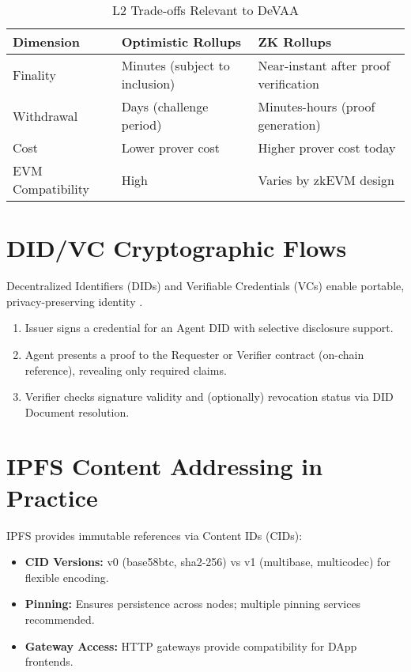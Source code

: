 \begin{table}[h]
\centering
\caption{L2 Trade-offs Relevant to DeVAA}
\label{tab:l2-tradeoffs}
\begin{tabular}{p{3.5cm}p{5.5cm}p{5.5cm}}
\toprule
\textbf{Dimension} & \textbf{Optimistic Rollups} & \textbf{ZK Rollups} \\
\midrule
Finality & Minutes (subject to inclusion) & Near-instant after proof verification \\
Withdrawal & Days (challenge period) & Minutes-hours (proof generation) \\
Cost & Lower prover cost & Higher prover cost today \\
EVM Compatibility & High & Varies by zkEVM design \\
\bottomrule
\end{tabular}
\end{table}

\section{DID/VC Cryptographic Flows}

Decentralized Identifiers (DIDs) and Verifiable Credentials (VCs) enable portable, privacy-preserving identity \citep{w3c-did-v1,w3c-vc-2}.
\begin{enumerate}
    \item Issuer signs a credential for an Agent DID with selective disclosure support.
    \item Agent presents a proof to the Requester or Verifier contract (on-chain reference), revealing only required claims.
    \item Verifier checks signature validity and (optionally) revocation status via DID Document resolution.
\end{enumerate}

\section{IPFS Content Addressing in Practice}

IPFS provides immutable references via Content IDs (CIDs):
\begin{itemize}
    \item \textbf{CID Versions:} v0 (base58btc, sha2-256) vs v1 (multibase, multicodec) for flexible encoding.
    \item \textbf{Pinning:} Ensures persistence across nodes; multiple pinning services recommended.
    \item \textbf{Gateway Access:} HTTP gateways provide compatibility for DApp frontends.
\end{itemize}

